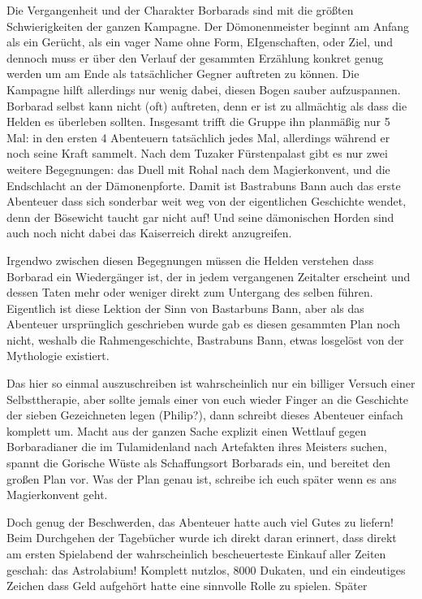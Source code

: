 Die Vergangenheit und der Charakter Borbarads sind mit die größten Schwierigkeiten der ganzen Kampagne.
Der Dömonenmeister beginnt am Anfang als ein Gerücht, als ein vager Name ohne Form, EIgenschaften, oder Ziel, und dennoch muss er über den Verlauf der gesammten Erzählung konkret genug werden um am Ende als tatsächlicher Gegner auftreten zu können.
Die Kampagne hilft allerdings nur wenig dabei, diesen Bogen sauber aufzuspannen.
Borbarad selbst kann nicht (oft) auftreten, denn er ist zu allmächtig als dass die Helden es überleben sollten.
Insgesamt trifft die Gruppe ihn planmäßig nur 5 Mal: in den ersten 4 Abenteuern tatsächlich jedes Mal, allerdings während er noch seine Kraft sammelt.
Nach dem Tuzaker Fürstenpalast gibt es nur zwei weitere Begegnungen: das Duell mit Rohal nach dem Magierkonvent, und die Endschlacht an der Dämonenpforte.
Damit ist Bastrabuns Bann auch das erste Abenteuer dass sich sonderbar weit weg von der eigentlichen Geschichte wendet, denn der Bösewicht taucht gar nicht auf!
Und seine dämonischen Horden sind auch noch nicht dabei das Kaiserreich direkt anzugreifen.

Irgendwo zwischen diesen Begegnungen müssen die Helden verstehen dass Borbarad ein Wiedergänger ist, der in jedem vergangenen Zeitalter erscheint und dessen Taten mehr oder weniger direkt zum Untergang des selben führen.
Eigentlich ist diese Lektion der Sinn von Bastarbuns Bann, aber als das Abenteuer ursprünglich geschrieben wurde gab es diesen gesammten Plan noch nicht, weshalb die Rahmengeschichte, Bastrabuns Bann, etwas losgelöst von der Mythologie existiert.

Das hier so einmal auszuschreiben ist wahrscheinlich nur ein billiger Versuch einer Selbsttherapie, aber sollte jemals einer von euch wieder Finger an die Geschichte der sieben Gezeichneten legen (Philip?), dann schreibt dieses Abenteuer einfach komplett um.
Macht aus der ganzen Sache explizit einen Wettlauf gegen Borbaradianer die im Tulamidenland nach Artefakten ihres Meisters suchen, spannt die Gorische Wüste als Schaffungsort Borbarads ein, und bereitet den großen Plan vor.
Was der Plan genau ist, schreibe ich euch später wenn es ans Magierkonvent geht.

Doch genug der Beschwerden, das Abenteuer hatte auch viel Gutes zu liefern! Beim Durchgehen der Tagebücher wurde ich direkt daran erinnert, dass direkt am ersten Spielabend der wahrscheinlich bescheuerteste Einkauf aller Zeiten geschah: das Astrolabium! Komplett nutzlos, 8000 Dukaten, und ein eindeutiges Zeichen dass Geld aufgehört hatte eine sinnvolle Rolle zu spielen.
Später


